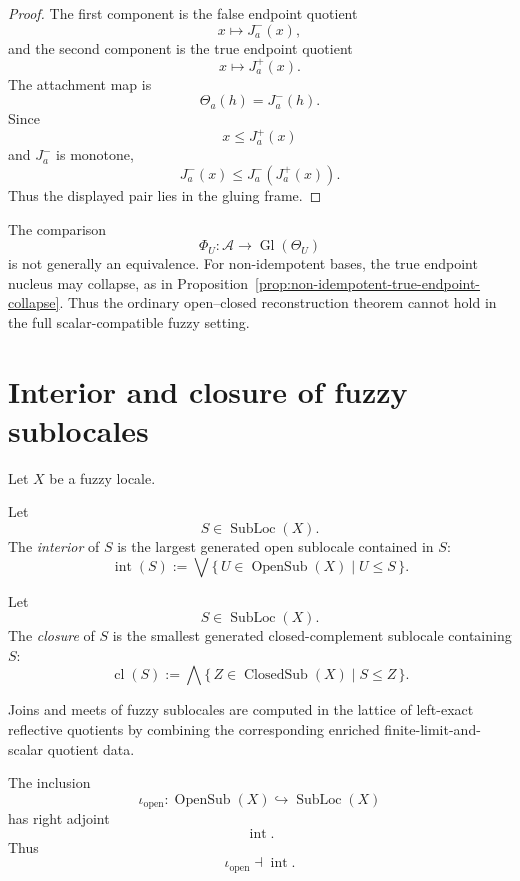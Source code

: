 \begin{proof}
The first component is the false endpoint quotient
\[
    x\mapsto J_a^-(x),
\]
and the second component is the true endpoint quotient
\[
    x\mapsto J_a^+(x).
\]
The attachment map is
\[
    \Theta_a(h)=J_a^-(h).
\]
Since
\[
    x\leq J_a^+(x)
\]
and \(J_a^-\) is monotone,
\[
    J_a^-(x)\leq J_a^-(J_a^+(x)).
\]
Thus the displayed pair lies in the gluing frame.
\end{proof}

\begin{remark}
\label{rem:no-general-reconstruction-theorem}
The comparison
\[
    \Phi_U:\mathcal A\to\operatorname{Gl}(\Theta_U)
\]
is not generally an equivalence.  For non-idempotent bases, the true endpoint
nucleus may collapse, as in Proposition~\ref{prop:non-idempotent-true-endpoint-collapse}.
Thus the ordinary open--closed reconstruction theorem cannot hold in the full
scalar-compatible fuzzy setting.
\end{remark}

\section{Interior and closure of fuzzy sublocales}
\label{sec:fuzzy-interior-closure-corrected}

Let \(X\) be a fuzzy locale.

\begin{definition}[Interior]
\label{def:fuzzy-sublocale-interior}
Let
\[
    S\in\operatorname{SubLoc}(X).
\]
The \emph{interior} of \(S\) is the largest generated open sublocale contained
in \(S\):
\[
    \operatorname{int}(S)
    :=
    \bigvee
    \{\,U\in\operatorname{OpenSub}(X)\mid U\leq S\,\}.
\]
\end{definition}

\begin{definition}[Closure]
\label{def:fuzzy-sublocale-closure}
Let
\[
    S\in\operatorname{SubLoc}(X).
\]
The \emph{closure} of \(S\) is the smallest generated closed-complement
sublocale containing \(S\):
\[
    \operatorname{cl}(S)
    :=
    \bigwedge
    \{\,Z\in\operatorname{ClosedSub}(X)\mid S\leq Z\,\}.
\]
\end{definition}

Joins and meets of fuzzy sublocales are computed in the lattice of left-exact
reflective quotients by combining the corresponding enriched
finite-limit-and-scalar quotient data.

\begin{proposition}
\label{prop:fuzzy-interior-adjunction}
The inclusion
\[
    \iota_{\mathrm{open}}:
    \operatorname{OpenSub}(X)
    \hookrightarrow
    \operatorname{SubLoc}(X)
\]
has right adjoint
\[
    \operatorname{int}.
\]
Thus
\[
    \iota_{\mathrm{open}}\dashv\operatorname{int}.
\]
\end{proposition}

